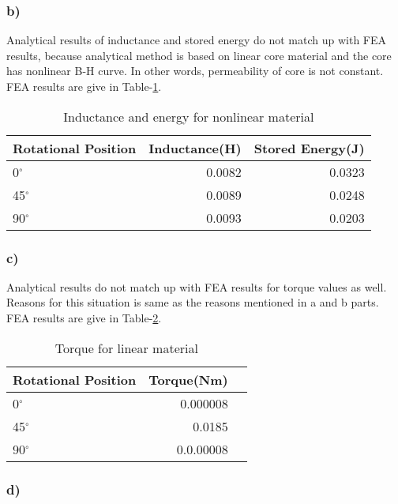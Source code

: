 \documentclass[11pt, a4paper]{article}
\begin{document}
\subsubsection*{b)}

Analytical results of inductance and stored energy do not match up with FEA results, because analytical method is based on linear core material and the core has nonlinear B-H curve. In other words, permeability of core is not constant. FEA results are give in Table-\ref{tab:nonlinear_in_en}.

\begin{table}[ht]
\centering
\caption{Inductance and energy for nonlinear material} 
\begin{tabular}[t]{lrr}
\hline
Rotational Position        & Inductance(H) & Stored Energy(J)  \\
\hline
0$^\circ$     & 0.0082       & 0.0323     \\
45$^\circ$    & 0.0089       & 0.0248     \\
90$^\circ$    & 0.0093       & 0.0203     \\
\hline
\end{tabular}
\label{tab:nonlinear_in_en}
\end{table}

\subsubsection*{c)}

Analytical results do not match up with FEA results for torque values as well. Reasons for this situation is same as the reasons mentioned in a and b parts. FEA results are give in Table-\ref{tab:nonlinear_tor}.

\begin{table}[ht]
\centering
\caption{Torque for linear material} 
\begin{tabular}[t]{lrr}
\hline
Rotational Position        & Torque(Nm)  \\
\hline
0$^\circ$     & 0.000008           \\
45$^\circ$    & 0.0185            \\
90$^\circ$    & 0.0.00008              \\
\hline
\end{tabular}
\label{tab:nonlinear_tor}
\end{table}

\subsubsection*{d)}
\end{document}
